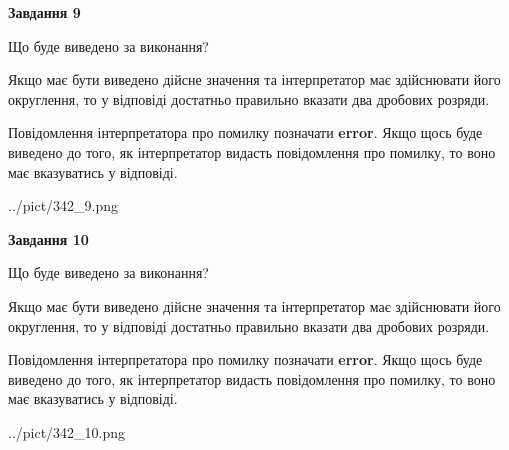 \documentclass[12pt, ukrainian]{article}
\begin{document}
{\begin {Large}
{\begin {center}\textbf{Завдання 9}\end {center}}\par
Що буде виведено за виконання? \par

Якщо має бути виведено дійсне значення та інтерпретатор має здійснювати його округлення, 
то у відповіді достатньо правильно вказати два дробових розряди.

Повідомлення інтерпретатора про помилку позначати \textbf{error}.
Якщо щось буде виведено до того, як інтерпретатор видасть повідомлення про помилку, 
то воно має вказуватись у відповіді. \par

\begin{center}
	{../pict/342_9.png}
\end{center}
\newpage

{\begin {center}\textbf{Завдання 10}\end {center}}\par
Що буде виведено за виконання? \par

Якщо має бути виведено дійсне значення та інтерпретатор має здійснювати його округлення, 
то у відповіді достатньо правильно вказати два дробових розряди.

Повідомлення інтерпретатора про помилку позначати \textbf{error}.
Якщо щось буде виведено до того, як інтерпретатор видасть повідомлення про помилку, 
то воно має вказуватись у відповіді. \par

\begin{center}
	{../pict/342_10.png}
\end{center}
\newpage

\end {Large}}
\end{document}
